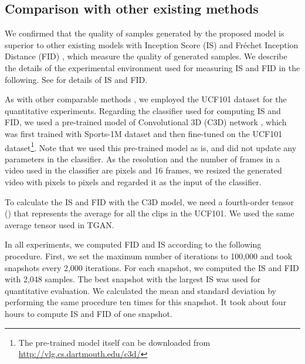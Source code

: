 \documentclass[twocolumn]{svjour3}
\begin{document}
\subsection{Comparison with other existing methods}
\label{sec:exp_comparison}
We confirmed that the quality of samples generated by the proposed model is superior to other existing models with Inception Score (IS) \cite{Salimans2016} and Fr\'echet Inception Distance (FID) \cite{Heusel2017}, which measure the quality of generated samples. We describe the details of the experimental environment used for measuring IS and FID in the following. See \cite{Borji2018} for details of IS and FID.

As with other comparable methods \cite{Saito2017,Tulyakov2018,Acharya2018},
we employed the UCF101 dataset \cite{Soomro2012} for the quantitative experiments.
Regarding the classifier used for computing IS and FID,
we used a pre-trained model of Convolutional 3D (C3D) network \cite{Tran2015},
which was first trained with Sports-1M dataset \cite{Karpathy2014}
and then fine-tuned on the UCF101 dataset\footnote{
The pre-trained model itself can be downloaded from \url{http://vlg.cs.dartmouth.edu/c3d/}}.
Note that we used this pre-trained model as is,
and did not update any parameters in the classifier.
As the resolution and the number of frames in a video used in the classifier are
 pixels and 16 frames,
we resized the generated video with  pixels to  pixels
and regarded it as the input of the classifier. 


To calculate the IS and FID with the C3D model, we need a fourth-order tensor () that represents the average for all the clips in the UCF101.
We used the same average tensor used in TGAN.


In all experiments, we computed FID and IS according to the following procedure.
First, we set the maximum number of iterations to 100,000 and took snapshots every 2,000 iterations. For each snapshot, we computed the IS and FID with 2,048 samples.
The best snapshot with the largest IS was used for quantitative evaluation.
We calculated the mean and standard deviation by performing the same procedure ten times for this snapshot.
It took about four hours to compute IS and FID of one snapshot.
\end{document}
